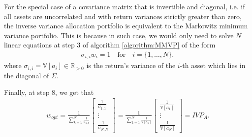     \begin{remark}\label{remark:IVPEquivalentToMMVP}
        For the special case of a covariance matrix that is invertible and diagonal, i.e. if all assets are uncorrelated and with return variances strictly greater than zero, the inverse variance allocation portfolio is equivalent to the Markowitz minimum variance portfolio. This is because in such case, we would only need to solve $N$ linear equations at step 3 of algorithm \ref{algorithm:MMVP} of the form
        \begin{align*}
            \sigma_{i,i} w_i = 1 \quad \text{for} \quad i = \{ 1, \dots, N \},
        \end{align*}
        where $\sigma_{i,i} = \mathbb{V}[a_i] \in \mathbb{R}_{>0}$ is the return's variance of the $i$-th asset which lies in the diagonal of $\Sigma$.
        
        Finally, at step 8, we get that
        \begin{align*}
            w_{opt} = \frac{1}{\sum_{k=1}^N \frac{1}{\sigma_{k,k}}} \begin{bmatrix} 
                                                    \frac{1}{\sigma_{1,1}} \\
                                                    \vdots \\
                                                    \frac{1}{\sigma_{N,N}}
                                                \end{bmatrix} = \frac{1}{\sum_{k=1}^N \frac{1}{\mathbb{V}[a_k]}}                     \begin{bmatrix} 
                                                                        \frac{1}{\mathbb{V}[a_1]} \\
                                                                        \vdots \\
                                                                        \frac{1}{\mathbb{V}[a_N]}
                                                                    \end{bmatrix} = IVP_A.
        \end{align*}
    \end{remark}
    
